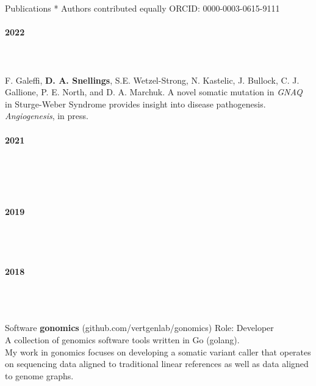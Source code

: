 \documentclass{resume} %
\begin{document}
\begin{rSection}{Publications}
{* Authors contributed equally} \hfill {ORCID: 0000-0003-0615-9111}
%
\\ \\ {\bf 2022} 
\\
\\ 
\\ 
\\ F. Galeffi, {\bf D. A. Snellings}, S.E. Wetzel-Strong, N. Kastelic, J. Bullock, C. J. Gallione, P. E. North, and D. A. Marchuk. 
A novel somatic mutation in \textit{GNAQ} in Sturge-Weber Syndrome provides insight into disease pathogenesis. \textit{Angiogenesis}, in press.
%
\\ \\ {\bf 2021} 
\\
\\ 
\\
\\ 
%
\\ \\{\bf 2019} 
\\ 
\\
\\ 
%
\\ \\ {\bf 2018}
\\ 
\\
\\ 
\\
\end{rSection}


\begin{rSection}{Software}
{\bf gonomics} {(github.com/vertgenlab/gonomics)} \hfill{Role: Developer}
\\ {A collection of genomics software tools written in Go (golang).}
\\ {My work in gonomics focuses on developing a somatic variant caller that operates on sequencing data 
aligned to traditional linear references as well as data aligned to genome graphs.}


\end{rSection}
\end{document}

